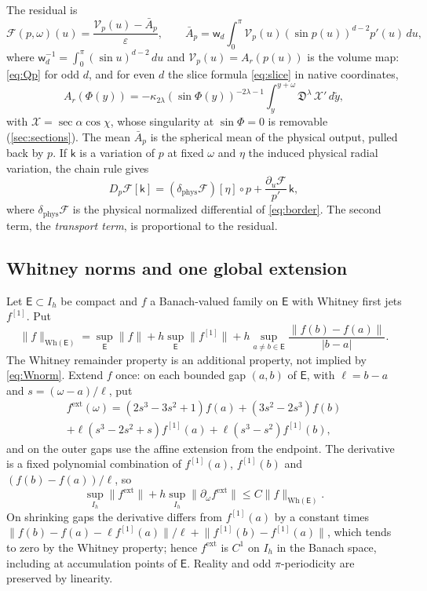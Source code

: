 \documentclass[11pt]{amsart}
\numberwithin{equation}{section}
\theoremstyle{definition}
\theoremstyle{remark}
\newcommand{\eps}{\varepsilon}
\newcommand{\abs}[1]{\lvert #1\rvert}
\newcommand{\norm}[1]{\lVert #1\rVert}
\newcommand{\Disc}{\mathfrak D}
\newcommand{\cF}{\mathcal F}
\newcommand{\cV}{\mathcal V}
\begin{document}
The residual is
\begin{equation}\label{eq:resid}
\cF(p,\omega)(u)=\frac{\cV_p(u)-\bar A_p}{\eps},\qquad
\bar A_p=\mathsf w_d\int_0^\pi\cV_p(u)(\sin p(u))^{d-2}p'(u)\,du,
\end{equation}
where $\mathsf w_d^{-1}=\int_0^\pi(\sin u)^{d-2}\,du$ and $\cV_p(u)=A_r(p(u))$ is the volume map: \eqref{eq:Qp} for odd $d$, and for even $d$ the slice formula \eqref{eq:slice} in native coordinates,
\begin{equation}\label{eq:evenQ}
A_r(\Phi(y))=-\kappa_{2\lambda}(\sin\Phi(y))^{-2\lambda-1}\int_y^{y+\omega}\Disc^\lambda\,\mathcal X'\,d\tilde y,
\end{equation}
with $\mathcal X=\sec\alpha\cos\chi$, whose singularity at $\sin\Phi=0$ is removable (\cref{sec:sections}). The mean $\bar A_p$ is the spherical mean of the physical output, pulled back by $p$. If $\mathsf k$ is a variation of $p$ at fixed $\omega$ and $\eta$ the induced physical radial variation, the chain rule gives
\begin{equation}\label{eq:transport}
D_p\cF[\mathsf k]=(\delta_{\mathrm{phys}}\cF)[\eta]\circ p+\frac{\partial_u\cF}{p'}\,\mathsf k ,
\end{equation}
where $\delta_{\mathrm{phys}}\cF$ is the physical normalized differential of \eqref{eq:border}. The second term, the \emph{transport term}, is proportional to the residual.

\subsection{Whitney norms and one global extension}
Let $\mathsf E\subset I_h$ be compact and $f$ a Banach-valued family on $\mathsf E$ with Whitney first jets $f^{[1]}$. Put
\begin{equation}\label{eq:Wnorm}
\norm f_{\mathrm{Wh}(\mathsf E)}=\sup_{\mathsf E}\norm f+h\sup_{\mathsf E}\norm{f^{[1]}}+h\sup_{a\ne b\in\mathsf E}\frac{\norm{f(b)-f(a)}}{\abs{b-a}} .
\end{equation}
The Whitney remainder property is an additional property, not implied by \eqref{eq:Wnorm}. Extend $f$ once: on each bounded gap $(a,b)$ of $\mathsf E$, with $\ell=b-a$ and $s=(\omega-a)/\ell$, put
\begin{multline*}
f^{\mathrm{ext}}(\omega)=(2s^3-3s^2+1)f(a)+(3s^2-2s^3)f(b)\\
+\ell(s^3-2s^2+s)f^{[1]}(a)+\ell(s^3-s^2)f^{[1]}(b),
\end{multline*}
and on the outer gaps use the affine extension from the endpoint. The derivative is a fixed polynomial combination of $f^{[1]}(a)$, $f^{[1]}(b)$ and $(f(b)-f(a))/\ell$, so
\begin{equation}\label{eq:hermite}
\sup_{I_h}\norm{f^{\mathrm{ext}}}+h\sup_{I_h}\norm{\partial_\omega f^{\mathrm{ext}}}\le C\norm f_{\mathrm{Wh}(\mathsf E)} .
\end{equation}
On shrinking gaps the derivative differs from $f^{[1]}(a)$ by a constant times $\norm{f(b)-f(a)-\ell f^{[1]}(a)}/\ell+\norm{f^{[1]}(b)-f^{[1]}(a)}$, which tends to zero by the Whitney property; hence $f^{\mathrm{ext}}$ is $C^1$ on $I_h$ in the Banach space, including at accumulation points of $\mathsf E$. Reality and odd $\pi$-periodicity are preserved by linearity.
\end{document}
